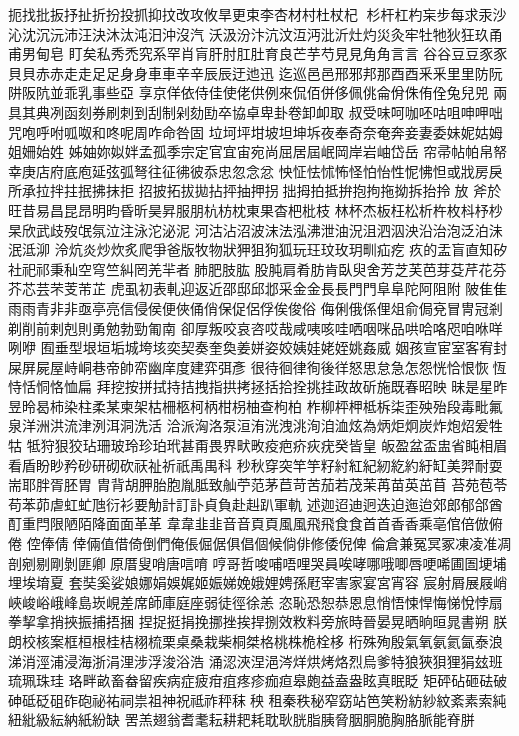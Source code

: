 扼找批扳抒扯折扮投抓抑抆改攻攸旱更束李杏材村杜杖杞
杉杆杠杓杗步每求汞沙沁沈沉沅沛汪決沐汰沌汨沖沒汽
沃汲汾汴沆汶沍沔沘沂灶灼災灸牢牡牠狄狂玖甬甫男甸皂
盯矣私秀禿究系罕肖肓肝肘肛肚育良芒芋芍見⾒角⾓言⾔
谷⾕豆⾖豕⾗貝⾙赤⾚走⾛足⾜身⾝車⾞辛⾟辰⾠迂迆迅
迄巡⾢邑邢邪邦那酉⾣釆⾤里⾥防阮阱阪阬並乖乳事些亞
享京佯依侍佳使佬供例來侃佰併侈佩佻侖佾侏侑佺兔兒兕
兩具其典冽函刻券刷刺到刮制剁劾劻卒協卓卑卦卷卸卹取
叔受味呵咖呸咕咀呻呷咄咒咆呼咐呱呶和咚呢周咋命咎固
垃坷坪坩坡坦坤坼夜奉奇奈奄奔妾妻委妹妮姑姆姐姍始姓
姊妯妳姒姅孟孤季宗定官宜宙宛尚屈居屆岷岡岸岩岫岱岳
帘帚帖帕帛帑幸庚店府底庖延弦弧弩往征彿彼忝忠忽念忿
怏怔怯怵怖怪怕怡性怩怫怛或戕房戾所承拉拌拄抿拂抹拒
招披拓拔拋拈抨抽押拐拙拇拍抵拚抱拘拖拗拆抬拎放
斧於旺昔易昌昆昂明昀昏昕昊昇服朋杭枋枕東果杳杷枇枝
林杯杰板枉松析杵枚枓杼杪杲欣武歧歿氓氛泣注泳沱泌泥
河沽沾沼波沫法泓沸泄油況沮泗泅泱沿治泡泛泊沬泯泜泖
泠炕炎炒炊炙爬爭爸版牧物狀狎狙狗狐玩玨玟玫玥甽疝疙
疚的盂盲直知矽社祀祁秉秈空穹竺糾罔羌羋者肺肥肢肱
股肫肩肴肪肯臥臾舍芳芝芙芭芽芟芹花芬芥芯芸芣芰芾芷
虎虱初表軋迎返近邵邸邱邶采金⾦長⾧門⾨阜⾩陀阿阻附
陂隹⾫雨⾬青⾮非亟亭亮信侵侯便俠俑俏保促侶俘俟俊俗
侮俐俄係俚俎俞侷兗冒冑冠剎剃削前剌剋則勇勉勃勁匍南
卻厚叛咬哀咨哎哉咸咦咳哇哂咽咪品哄哈咯咫咱咻咩咧咿
囿垂型垠垣垢城垮垓奕契奏奎奐姜姘姿姣姨娃姥姪姚姦威
姻孩宣宦室客宥封屎屏屍屋峙峒巷帝帥帟幽庠度建弈弭彥
很待徊律徇後徉怒思怠急怎怨恍恰恨恢恆恃恬恫恪恤扁
拜挖按拼拭持拮拽指拱拷拯括拾拴挑挂政故斫施既春昭映
昧是星昨昱昤曷柿染柱柔某柬架枯柵柩柯柄柑枴柚查枸柏
柞柳枰柙柢柝柒歪殃殆段毒毗氟泉洋洲洪流津洌洱洞洗活
洽派洶洛泵洹洧洸洩洮洵洎洫炫為炳炬炯炭炸炮炤爰牲牯
牴狩狠狡玷珊玻玲珍珀玳甚甭畏界畎畋疫疤疥疢疣癸皆皇
皈盈盆盃盅省盹相眉看盾盼眇矜砂研砌砍祆祉祈祇禹禺科
秒秋穿突竿竽籽紂紅紀紉紇約紆缸美羿耐耍耑耶胖胥胚胃
胄背胡胛胎胞胤胝致舢苧范茅苣苛苦茄若茂茉苒苗英茁苜
苔苑苞苓苟苯茆虐虹虻虺衍衫要觔計訂訃貞負赴赳趴軍軌
述迦迢迪迥迭迫迤迨郊郎郁郃酋酊重閂限陋陌降面⾯革⾰
韋⾱韭⾲音⾳頁⾴風⾵飛⾶食⾷首⾸香⾹乘亳倌倍倣俯倦
倥俸倩倖倆值借倚倒們俺倀倔倨俱倡個候倘俳修倭倪俾
倫倉兼冤冥冢凍凌准凋剖剜剔剛剝匪卿原厝叟哨唐唁唷
哼哥哲唆哺唔哩哭員唉哮哪哦唧唇哽唏圃圄埂埔埋埃堉夏
套奘奚娑娘娜娟娛娓姬娠娣娩娥娌娉孫屘宰害家宴宮宵容
宸射屑展屐峭峽峻峪峨峰島崁峴差席師庫庭座弱徒徑徐恙
恣恥恐恕恭恩息悄悟悚悍悔悌悅悖扇拳挈拿捎挾振捕捂捆
捏捉挺捐挽挪挫挨捍捌效敉料旁旅時晉晏晃晒晌晅晁書朔
朕朗校核案框桓根桂桔栩梳栗桌桑栽柴桐桀格桃株桅栓栘
桁殊殉殷氣氧氨氦氤泰浪涕消涇浦浸海浙涓浬涉浮浚浴浩
涌涊浹涅浥涔烊烘烤烙烈烏爹特狼狹狽狸狷玆班琉珮珠珪
珞畔畝畜畚留疾病症疲疳疽疼疹痂疸皋皰益盍盎眩真眠眨
矩砰砧砸砝破砷砥砭砠砟砲祕祐祠祟祖神祝祗祚秤秣秧
租秦秩秘窄窈站笆笑粉紡紗紋紊素索純紐紕級紜納紙紛缺
罟羔翅翁耆耄耘耕耙耗耽耿胱脂胰脅胭胴脆胸胳脈能脊胼
